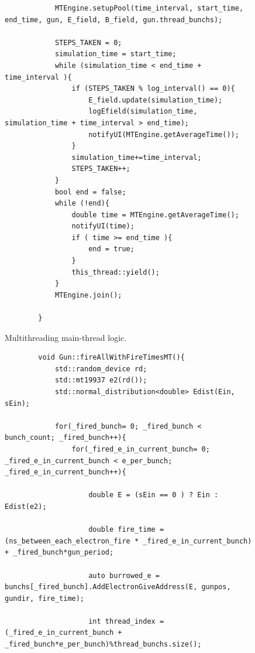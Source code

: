 \documentclass[a4paper,oneside,12pt]{report}
\numberwithin{equation}{chapter}
\begin{document}
{\begin{figure}[H]
\begin{verbatim}
            MTEngine.setupPool(time_interval, start_time, end_time, gun, E_field, B_field, gun.thread_bunchs);
        
            STEPS_TAKEN = 0;
            simulation_time = start_time;
            while (simulation_time < end_time + time_interval ){
                if (STEPS_TAKEN % log_interval() == 0){
                    E_field.update(simulation_time);
                    logEfield(simulation_time, simulation_time + time_interval > end_time);
                    notifyUI(MTEngine.getAverageTime());
                }
                simulation_time+=time_interval;
                STEPS_TAKEN++;
            }
            bool end = false;
            while (!end){
                double time = MTEngine.getAverageTime();
                notifyUI(time);
                if ( time >= end_time ){
                    end = true;
                }
                this_thread::yield();
            }
            MTEngine.join();
            
        }
    \end{verbatim}
    \vspace{20pt}
    \caption{Multithreading main-thread logic.}
    \label{fig:_runMT}
\end{figure}
\vspace{20pt}
\begin{figure}[H]
    \centering
    \begin{verbatim}
        void Gun::fireAllWithFireTimesMT(){
            std::random_device rd;
            std::mt19937 e2(rd());
            std::normal_distribution<double> Edist(Ein, sEin);
    
            for(_fired_bunch= 0; _fired_bunch < bunch_count; _fired_bunch++){
                for(_fired_e_in_current_bunch= 0; _fired_e_in_current_bunch < e_per_bunch; _fired_e_in_current_bunch++){
    
                    double E = (sEin == 0 ) ? Ein : Edist(e2);
    
                    double fire_time = (ns_between_each_electron_fire * _fired_e_in_current_bunch) + _fired_bunch*gun_period;
    
                    auto burrowed_e = bunchs[_fired_bunch].AddElectronGiveAddress(E, gunpos, gundir, fire_time);
    
                    int thread_index = (_fired_e_in_current_bunch + _fired_bunch*e_per_bunch)%thread_bunchs.size();
    

\end{verbatim}
\end{figure}}
\end{document}
